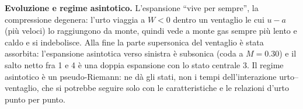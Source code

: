 \documentclass[11pt,a4paper]{article}
\newcommand{\uma}{u-a}
\begin{document}
\textbf{Evoluzione e regime asintotico.} L'espansione ``vive per sempre'', la compressione degenera: l'urto viaggia
a $W<0$ dentro un ventaglio le cui $\uma$ (più veloci) lo raggiungono da monte, quindi vede a monte gas sempre più
lento e caldo e si indebolisce. Alla fine la parte supersonica del ventaglio è stata assorbita: l'espansione
asintotica verso sinistra è subsonica (coda a $M=\num{0.30}$) e il salto netto fra 1 e 4 è una doppia
espansione con lo stato centrale 3. Il regime asintotico è un pseudo-Riemann: ne dà gli stati, non i tempi
dell'interazione urto--ventaglio, che si potrebbe seguire solo con le caratteristiche e le relazioni d'urto
punto per punto.
\end{document}
